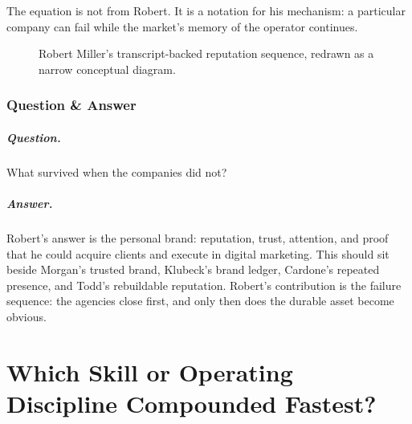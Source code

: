 \documentclass[11pt,oneside]{book}
\begin{document}
The equation is not from Robert. It is a notation for his mechanism: a particular company can fail while the market's memory of the operator continues.

\begin{figure}
\centering
{}
\caption{Robert Miller's transcript-backed reputation sequence, redrawn as a narrow conceptual diagram.}
\end{figure}

\subsection{Question \& Answer}

\paragraph{Question.}
What survived when the companies did not?

\paragraph{Answer.}
Robert's answer is the personal brand: reputation, trust, attention, and proof that he could acquire clients and execute in digital marketing. This should sit beside Morgan's trusted brand, Klubeck's brand ledger, Cardone's repeated presence, and Todd's rebuildable reputation. Robert's contribution is the failure sequence: the agencies close first, and only then does the durable asset become obvious.

\chapter{Which Skill or Operating Discipline Compounded Fastest?}
\end{document}
